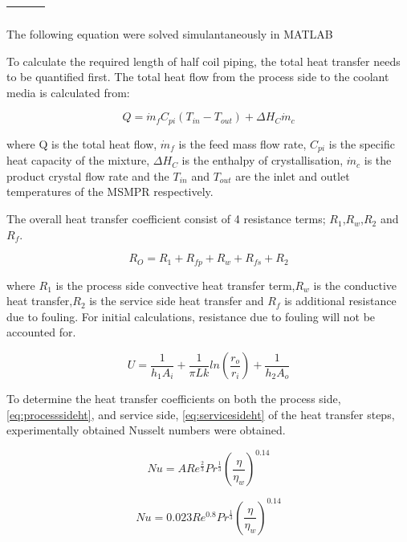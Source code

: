 \begin{table}
\begin{tabularx}{\linewidth}{XXX}
\begin{itemize}[label=-,leftmargin=1em]
\end{itemize}
\\\bottomrule
\end{tabularx}
\end{table}

The following equation were solved simulantaneously in MATLAB 


To calculate the required length of half coil piping, the total heat transfer needs to be quantified first. The total heat flow from the process side to the coolant media is calculated from:

\begin{equation} \label{eq:energy balance}
    Q =  \Dot{m}_{f}C_{pi}(T_{in}-T_{out})+ \Delta H_{C}\Dot{m}_{c}
\end{equation}

\noindent where Q is the total heat flow, $\Dot{m}_f$ is the feed mass flow rate, $C_{pi}$ is the specific heat capacity of the mixture, $\Delta H_{C}$ is the enthalpy of crystallisation, $\Dot{m}_{c}$ is the product crystal flow rate and the $T_{in}$ and $T_{out}$ are the inlet and outlet temperatures of the MSMPR respectively.


The overall heat transfer coefficient consist of 4 resistance terms; $R_1$,$R_w$,$R_2$ and $R_f$.

\begin{equation} \label{eq:resistht}
    R_O = R_1 + R_{fp} + R_w + R_{fs} + R_2
\end{equation}

where $R_1$ is the process side convective heat transfer term,$R_w$ is the conductive heat transfer,$R_2$ is the service side heat transfer and $R_f$ is additional resistance due to fouling. For initial calculations, resistance due to fouling will not be accounted for.

\begin{equation} \label{eq:energy balance}
    U = \frac{1}{h_1 A_i} + \frac{1}{\pi Lk} ln \left(\frac{r_o}{r_i} \right) + \frac{1}{h_2 A_o} 
\end{equation}




To determine the heat transfer coefficients on both the process side,\ref{eq:processsideht},  and service side, \ref{eq:servicesideht} of the heat transfer steps, experimentally obtained Nusselt numbers were obtained. 


\begin{equation} \label{eq:processsideht}
    Nu = ARe^{\frac{2}{3}}Pr^{\frac{1}{3}}\left( \frac{\eta}{\eta_w} \right)^{0.14}
\end{equation}

\begin{equation} \label{eq:servicesideht}
    Nu = 0.023Re^{0.8}Pr^{\frac{1}{3}} \left( \frac{\eta}{\eta_w} \right)^{0.14}
\end{equation}



